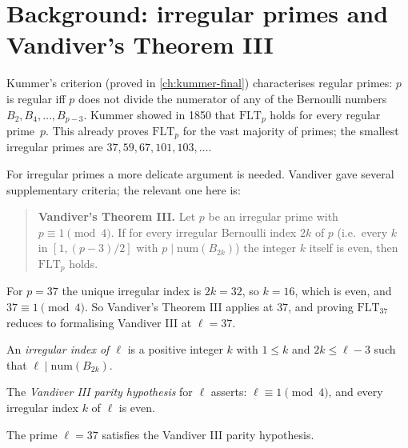 
\section{Background: irregular primes and Vandiver's Theorem III}

Kummer's criterion (proved in \cref{ch:kummer-final}) characterises regular
primes: $p$ is regular iff $p$ does not divide the numerator of any of the
Bernoulli numbers $B_2, B_4, \ldots, B_{p-3}$.  Kummer showed in 1850 that
$\mathrm{FLT}_p$ holds for every regular prime~$p$.  This already proves
$\mathrm{FLT}_p$ for the vast majority of primes; the smallest irregular
primes are $37, 59, 67, 101, 103, \ldots$.

For irregular primes a more delicate argument is needed.  Vandiver gave
several supplementary criteria; the relevant one here is:

\begin{quote}
  \textbf{Vandiver's Theorem III.}  Let $p$ be an irregular prime with
  $p \equiv 1 \pmod 4$.  If for every irregular Bernoulli index $2k$ of $p$
  (i.e.\ every $k$ in $[1, (p-3)/2]$ with $p \mid \mathrm{num}(B_{2k})$) the
  integer $k$ itself is even, then $\mathrm{FLT}_p$ holds.
\end{quote}

For $p = 37$ the unique irregular index is $2k = 32$, so $k = 16$, which is
even, and $37 \equiv 1 \pmod 4$.  So Vandiver's Theorem III applies at $37$,
and proving $\mathrm{FLT}_{37}$ reduces to formalising Vandiver III at
$\ell = 37$.

\begin{definition}
  \label{def:isIrregularIndex}
  \leanok
  An \emph{irregular index of $\ell$} is a positive integer $k$ with
  $1 \le k$ and $2k \le \ell - 3$ such that
  $\ell \mid \mathrm{num}(B_{2k})$.
\end{definition}

\begin{definition}
  \label{def:vandiverIIIHypothesis}
  \leanok
  The \emph{Vandiver III parity hypothesis} for $\ell$ asserts:
  $\ell \equiv 1 \pmod 4$, and every irregular index $k$ of $\ell$
  is even.
\end{definition}

\begin{theorem}
  \label{thm:vandiverIIIHypothesis_thirtyseven}
  \leanok
  The prime $\ell = 37$ satisfies the Vandiver III parity hypothesis.
\end{theorem}

